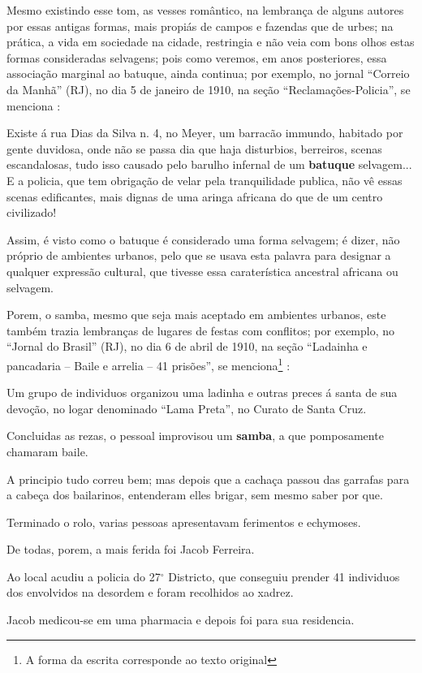Mesmo existindo esse tom, as vesses romântico, 
na lembrança de alguns autores por essas antigas formas,
mais propiás de campos e fazendas que de urbes;
na prática, a vida em sociedade na cidade, 
restringia e não veia com bons olhos estas formas consideradas selvagens;
pois como veremos, em anos posteriores, essa associação marginal ao batuque, ainda continua;
por exemplo, no jornal ``Correio da Manhã'' (RJ), 
no dia 5 de janeiro de 1910, na seção ``Reclamações-Policia'',
se menciona \cite[pp. 4]{batuqueperiodicocorreiomanha}:
\begin{citando}%
Existe á rua Dias da Silva n. 4, no 
Meyer, um barracão immundo, habitado por
gente duvidosa, onde não se passa dia que 
haja disturbios, berreiros, scenas 
escandalosas, tudo isso causado pelo barulho
infernal de um \textbf{batuque} selvagem... E a 
policia, que tem obrigação de velar pela 
tranquilidade publica, não vê essas scenas
edificantes, mais dignas de uma aringa 
africana do que de um centro civilizado!
\end{citando}
Assim, é visto como o batuque é considerado uma forma selvagem;
é dizer, não próprio de ambientes urbanos,
pelo que se usava esta palavra para designar a qualquer expressão cultural,
 que tivesse essa caraterística ancestral africana ou selvagem. 

Porem, o samba, mesmo que seja mais aceptado em ambientes urbanos,
este também trazia lembranças de lugares de festas com conflitos;
por exemplo, no ``Jornal do Brasil'' (RJ), 
no dia 6 de abril de 1910, na seção ``Ladainha e pancadaria -- Baile e arrelia -- 41 prisões'',
se menciona\footnote{\label{footort5}A forma da escrita corresponde ao texto original} \cite[pp. 12]{batuqueperiodicojornaldobrasil}:
\begin{citando}%
Um grupo de individuos organizou
uma ladinha e outras preces 
á santa de sua devoção, no logar 
denominado ``Lama Preta'', no 
Curato de Santa Cruz.

Concluidas as rezas, o pessoal 
improvisou um \textbf{samba}, a que 
pomposamente chamaram baile.

A principio tudo correu bem;
mas depois que a cachaça passou
das garrafas para a cabeça dos 
bailarinos, entenderam elles 
brigar, sem mesmo saber por que.

Terminado o rolo, varias 
pessoas apresentavam ferimentos e echymoses.

De todas, porem, a mais ferida foi Jacob Ferreira.

Ao local acudiu a policia do 27$^{\circ}$ 
Districto, que conseguiu prender 
41 individuos dos envolvidos na 
desordem e foram recolhidos ao xadrez.

Jacob medicou-se em uma pharmacia e depois foi para sua residencia.
\end{citando}


